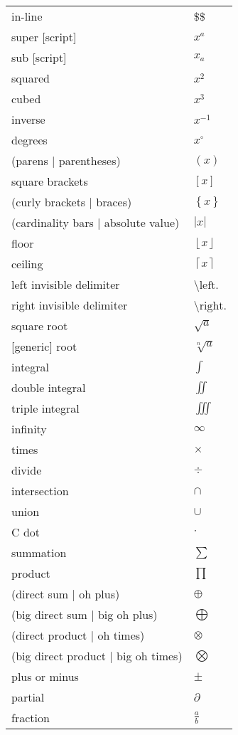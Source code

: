 \documentclass[12pt, a4paper]{article}
\begin{document}
\begin{longtable}{ll}
in-line & \$\$ \\
super [script] & $x^{a}$ \\
sub [script] & $x_{a}$ \\
squared & $x^{2} $ \\
cubed & $x^{3} $ \\
inverse & $x^{-1} $ \\
degrees & $x^{\circ}$ \\
(parens | parentheses) & $\left( x \right)$ \\
square brackets & $\left[ x \right] $ \\
(curly brackets | braces) & $\left\{ x \right\} $ \\
(cardinality bars | absolute value) & $\left| x \right|$ \\
floor & $\left \lfloor x \right \rfloor$ \\
ceiling & $\left \lceil x \right \rceil$ \\
left invisible delimiter & \textbackslash $\text{left.}$ \\
right invisible delimiter & \textbackslash $\text{right.}$ \\
square root & $\sqrt{a}$ \\
{[generic]} root & $\sqrt[n]{a}$ \\
integral & $\int$ \\
double integral & $\iint$ \\
triple integral & $\iiint$ \\
infinity & $\infty$ \\
times & $\times$ \\
divide & $\div$ \\
intersection & $\cap$ \\
union & $\cup$ \\
C dot & $\cdot$ \\
summation & $\sum$ \\
product & $\prod$ \\
(direct sum | oh plus) & $\oplus$ \\
(big direct sum | big oh plus) & $\bigoplus$ \\
(direct product | oh times) & $\otimes$ \\
(big direct product | big oh times) & $\bigotimes$ \\
plus or minus & $\pm$ \\
partial & $\partial$ \\
fraction & $\frac{a}{b}$ \\

\end{longtable}
\end{document}
